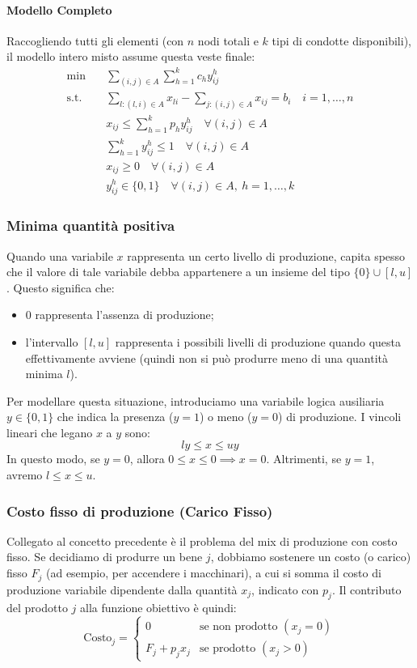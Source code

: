 \documentclass[12pt]{extarticle} %
\begin{document}
\paragraph{Modello Completo}
Raccogliendo tutti gli elementi (con $n$ nodi totali e $k$ tipi di condotte disponibili), il modello intero misto assume questa veste finale:
\[
\begin{aligned}
\min \quad & \sum_{(i,j) \in A} \sum_{h=1}^k c_h y_{ij}^h \\
\text{s.t.} \quad & \sum_{l: (l,i) \in A} x_{li} - \sum_{j: (i,j) \in A} x_{ij} = b_i \quad i=1,\dots,n \\
& x_{ij} \le \sum_{h=1}^k p_h y_{ij}^h \quad \forall (i,j) \in A \\
& \sum_{h=1}^k y_{ij}^h \le 1 \quad \forall (i,j) \in A \\
& x_{ij} \ge 0 \quad \forall (i,j) \in A \\
& y_{ij}^h \in \{0,1\} \quad \forall (i,j) \in A, \: h=1,\dots,k
\end{aligned}
\]

\subsubsection{Minima quantità positiva}
Quando una variabile $x$ rappresenta un certo livello di produzione, capita spesso che il valore di tale variabile debba appartenere a un insieme del tipo $\{0\} \cup [l, u]$.
Questo significa che:
\begin{itemize}
    \item $0$ rappresenta l'assenza di produzione;
    \item l'intervallo $[l, u]$ rappresenta i possibili livelli di produzione quando questa effettivamente avviene (quindi non si può produrre meno di una quantità minima $l$).
\end{itemize}
Per modellare questa situazione, introduciamo una variabile logica ausiliaria $y \in \{0,1\}$ che indica la presenza ($y=1$) o meno ($y=0$) di produzione.
I vincoli lineari che legano $x$ a $y$ sono:
\[
l y \le x \le u y
\]
In questo modo, se $y=0$, allora $0 \le x \le 0 \implies x=0$. Altrimenti, se $y=1$, avremo $l \le x \le u$.

\subsubsection{Costo fisso di produzione (Carico Fisso)}
Collegato al concetto precedente è il problema del mix di produzione con costo fisso. Se decidiamo di produrre un bene $j$, dobbiamo sostenere un costo (o carico) fisso $F_j$ (ad esempio, per accendere i macchinari), a cui si somma il costo di produzione variabile dipendente dalla quantità $x_j$, indicato con $p_j$.
Il contributo del prodotto $j$ alla funzione obiettivo è quindi:
\[
\text{Costo}_j = \begin{cases}
0 & \text{se non prodotto } (x_j = 0) \\
F_j + p_j x_j & \text{se prodotto } (x_j > 0)
\end{cases}
\]
\end{document}
